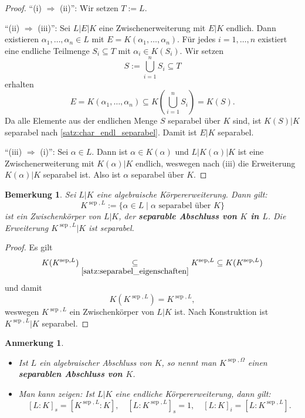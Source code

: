 \documentclass[a4paper, twoside, 11pt, ngerman]{report}
\DeclareMathOperator{\sep}{sep}
\theoremstyle{definistyle}
\newtheorem{bem}[satz]{Bemerkung}
\newtheorem{anm}[satz]{Anmerkung}
\theoremstyle{remark}
\newcommand{\defn}[1]{\textit{\bfseries #1}}
\begin{document}
\begin{proof}
"`(i) $\Rightarrow$ (ii)"': Wir setzen $T := L$.

"`(ii) $\Rightarrow$ (iii)"': Sei $L|E|K$ eine Zwischenerweiterung mit $E|K$ endlich. Dann existieren $\alpha_1, \dots, \alpha_n \in L$ mit $E = K(\alpha_1, \dots, \alpha_n)$. Für jedes $i = 1, \dots, n$ existiert eine endliche Teilmenge $S_i \subseteq T$ mit $\alpha_i \in K(S_i)$. Wir setzen 
\[
S := \bigcup_{i=1}^n S_i\subseteq T
\]
erhalten
\[
E = K(\alpha_1, \dots, \alpha_n) \subseteq K\left(\bigcup_{i=1}^n S_i\right)=K(S).
\]
Da alle Elemente aus der endlichen Menge $S$ separabel über $K$ sind, ist $K(S)|K$ separabel nach \ref{satz:char_endl_separabel}. Damit ist $E|K$ separabel.

"`(iii) $\Rightarrow$ (i)"': Sei $\alpha \in L$. Dann ist $\alpha \in K(\alpha)$ und $L|K(\alpha)|K$ ist eine Zwischenerweiterung mit $K(\alpha)|K$ endlich, weswegen nach (iii) die Erweiterung $K(\alpha)|K$ separabel ist. Also ist $\alpha$ separabel über $K$.
\end{proof}

\begin{bem}\label{bem:separabler_abschluss}
Sei $L|K$ eine algebraische Körpererweiterung. Dann gilt:
\[
K^{\sep, L} := \{\alpha \in L \mid \alpha \text{ separabel über } K\}
\]
ist ein Zwischenkörper von $L|K$, der \defn{separable Abschluss von $K$ in $L$}. Die Erweiterung $K^{\sep, L}|K$ ist separabel.
\end{bem}
\begin{proof}
Es gilt 
\[
K(K^{\sep, L}) \underset{\ref{satz:separabel_eigenschaften}}{\subseteq} K^{\sep, L}\subseteq K(K^{\sep, L})
\]
und damit
\[
K(K^{\sep, L}) = K^{\sep, L},
\]
weswegen $K^{\sep, L}$ ein Zwischenkörper von $L|K$ ist. Nach Konstruktion ist $K^{\sep, L}|K$ separabel.
\end{proof}

\begin{anm}
\begin{itemize}
\item Ist $L$ ein algebraischer Abschluss von $K$, so nennt man $K^{\sep,\Omega}$ einen \defn{separablen Abschluss von $K$}.

\item Man kann zeigen: Ist $L|K$ eine endliche Körpererweiterung, dann gilt:
\[
[L : K]_s = [K^{\sep, L} : K], \quad [L : K^{\sep, L}]_s = 1, \quad [L : K]_i = [L : K^{\sep, L}].
\]
\end{itemize}
\end{anm}
\end{document}
